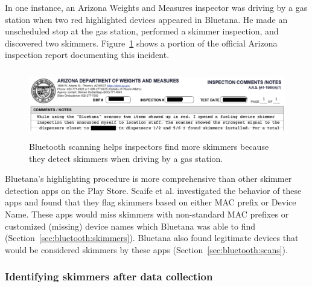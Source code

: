 In one instance, an Arizona Weights and Measures inspector was driving by a gas station when two red highlighted devices appeared in Bluetana.
%
He made an unscheduled stop at the gas station, performed a skimmer inspection, and discovered two skimmers.
%
Figure~\ref{fig:arizona_driveby} shows a portion of the official Arizona inspection report documenting this incident.

\begin{figure}[!h]
  \centering
  \captionsetup{justification=centering}
  \includegraphics[width=\textwidth,height=3cm]{skimmer/fig/arizona_driveby_anecdote.png}
  \caption{
  \label{fig:arizona_driveby}
 Bluetooth scanning helps inspectors find more skimmers because they detect skimmers when driving by a gas station.
  }
\end{figure}

Bluetana's highlighting procedure is more comprehensive than other skimmer detection apps on the Play Store.
%
Scaife et al. \cite{scaifeoakland} investigated the behavior of these apps and found that they flag skimmers based on either MAC prefix or Device Name.
%
These apps would miss skimmers with non-standard MAC prefixes or customized (missing) device names which Bluetana was able to find (Section~\ref{sec:bluetooth:skimmers}).
%
Bluetana also found legitimate devices that would be considered skimmers by these apps (Section~\ref{sec:bluetooth:scans}).

\subsubsection*{Identifying skimmers after data collection}
\label{sec:blu:identify}

